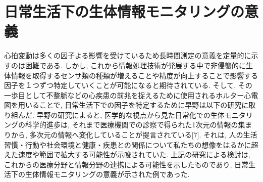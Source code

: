 \documentclass[report, 11pt, a4paper]{jsbook}
\begin{document}
\section{日常生活下の生体情報モニタリングの意義}
心拍変動は多くの因子よる影響を受けているため長時間測定の意義を定量的に示すのは困難である. しかし, これから情報処理技術が発展する中で非侵襲的に生体情報を取得するセンサ類の種類が増えることや精度が向上することで影響する因子を１つずつ特定していくことが可能になると期待されている. そして, その一歩目として不整脈などの心疾患の前兆を捉えるために使用されるホルター心電図を用いることで, 日常生活下での因子を特定するために早野は以下の研究に取り組んだ. 
早野の研究によると, 医学的な視点から見た日常化での生体モニタリングの科学的進歩は, それまで医療機関での診察で得られた1次元の情報の集まりから, 多次元の情報へ変化していることが提言されている[7]. それは, 人の生活習慣・行動や社会環境と健康・疾患との関係について私たちの想像をはるかに超えた速度や範囲で拡大する可能性が示唆されていた. 上記の研究による検討は, これからの医療分野と情報分野の連携による可能性を示したものであり, 日常生活下の生体情報モニタリングの意義が示された例であった.
\end{document}
